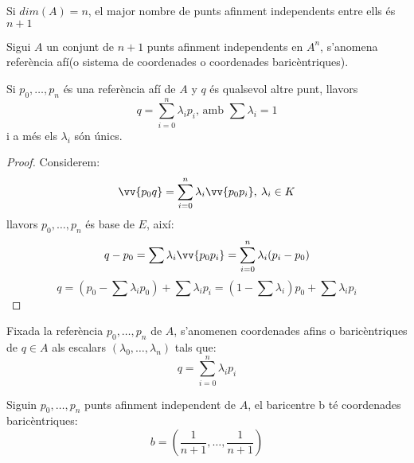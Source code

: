 \begin{cor}
	Si $dim(A)=n$, el major nombre de punts afinment independents entre ells és $n+1$
\end{cor}

\begin{defn}
	Sigui $A$ un conjunt de $n+1$ punts afinment independents en $A^n$, s'anomena referència afí(o sistema de coordenades o coordenades baricèntriques).
\end{defn}

\begin{prop}
	Si ${p_0,\dotsc ,p_n}$ és una referència afí de $A$ y $q$ és qualsevol altre punt, llavors
	$$q=\sum\limits_{i=0}^n\lambda_ip_i\text{, amb }\sum\lambda_i=1$$
	i a més els $\lambda_i$ són únics. 
\end{prop}
\begin{proof}
	Considerem:
	$$\vv{p_0q}=\sum\limits_{i=0}^n\lambda_i\vv{p_0p_i},\:\lambda_i\in K$$
	llavors ${p_0,\dotsc ,p_n}$ és base de $E$, així:
	$$q-p_0=\sum\limits\lambda_i\vv{p_0p_i}=\sum\limits_{i=0}^n\lambda_i(p_i-p_0)$$
	$$q=(p_0-\sum\limits\lambda_ip_0)+\sum\limits\lambda_ip_i=(1-\sum\limits\lambda_i)p_0+\sum\limits\lambda_ip_i$$
\end{proof}

\begin{defn}
	Fixada la referència ${p_0,\dotsc ,p_n}$ de $A$, s'anomenen coordenades afins o baricèntriques de $q\in A$ als escalars $(\lambda_0, \dotsc ,\lambda_n)$ tals que:
	$$q=\sum_{i=0}^n\lambda_ip_i$$
\end{defn}
\begin{exmp}
	Siguin ${p_0,\dotsc ,p_n}$ punts afinment independent de $A$, el baricentre b té coordenades baricèntriques:
	$$b=(\frac{1}{n+1},\dotsc ,\frac{1}{n+1})$$
\end{exmp}

